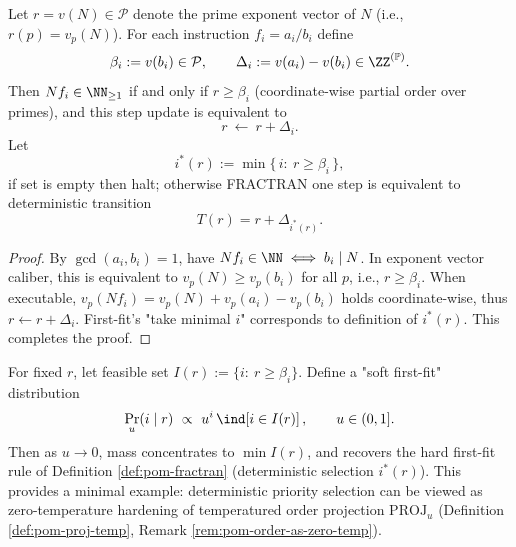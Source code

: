 \begin{proposition}[FRACTRAN = Order-Gated Translation on \texorpdfstring{$\mathcal{P}$}{P}]\label{prop:pom-fractran-prime-translation}
Let \(r=v(N)\in\mathcal{P}\) denote the prime exponent vector of \(N\) (i.e., \(r(p)=v_p(N)\)).
For each instruction \(f_i=a_i/b_i\) define
\[
\beta_i:=v(b_i)\in\mathcal{P},\qquad
\Delta_i:=v(a_i)-v(b_i)\in \ZZ^{(\mathbb{P})}.
\]
Then \(Nf_i\in\NN_{\ge 1}\) if and only if \(r\ge \beta_i\) (coordinate-wise partial order over primes), and this step update is equivalent to
\[
r\ \longleftarrow\ r+\Delta_i.
\]
Let
\[
i^\ast(r):=\min\{\,i:\ r\ge \beta_i\,\},
\]
if set is empty then halt; otherwise FRACTRAN one step is equivalent to deterministic transition
\[
T(r)=r+\Delta_{i^\ast(r)}.
\]
\end{proposition}
\begin{proof}
By \(\gcd(a_i,b_i)=1\), have \(Nf_i\in\NN\iff b_i\mid N\). In exponent vector caliber, this is equivalent to \(v_p(N)\ge v_p(b_i)\) for all \(p\), i.e., \(r\ge \beta_i\). When executable,
\(
v_p(Nf_i)=v_p(N)+v_p(a_i)-v_p(b_i)
\)
holds coordinate-wise, thus \(r\leftarrow r+\Delta_i\). First-fit's "take minimal \(i\)" corresponds to definition of \(i^\ast(r)\). This completes the proof.
\end{proof}

\begin{remark}\label{rem:pom-fractran-zero-temp}
For fixed \(r\), let feasible set \(I(r):=\{i:\ r\ge \beta_i\}\). Define a "soft first-fit" distribution
\[
\Pr_u(i\mid r)\ \propto\ u^{i}\,\ind\!\left[i\in I(r)\right],\qquad u\in(0,1].
\]
Then as \(u\to 0\), mass concentrates to \(\min I(r)\), and recovers the hard first-fit rule of Definition \ref{def:pom-fractran} (deterministic selection \(i^\ast(r)\)).
This provides a minimal example: deterministic priority selection can be viewed as zero-temperature hardening of temperatured order projection \(\mathrm{PROJ}_u\) (Definition \ref{def:pom-proj-temp}, Remark \ref{rem:pom-order-as-zero-temp}).
\end{remark}

